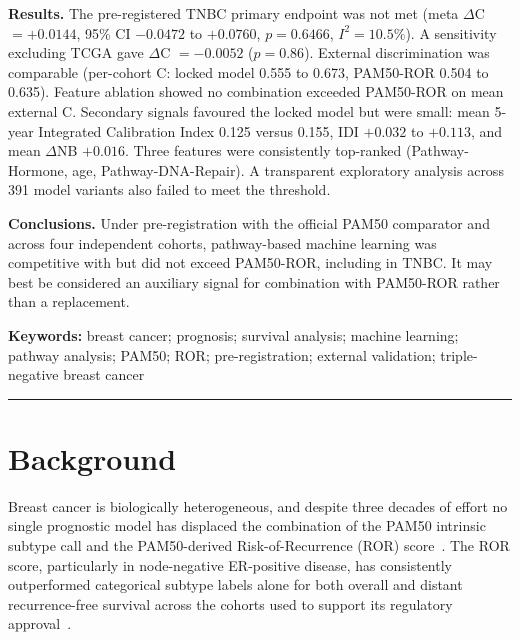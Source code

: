 \documentclass[11pt,letterpaper]{article}
\begin{document}
\noindent\textbf{Results.} The pre-registered TNBC primary endpoint was not met (meta $\Delta$C $= +0.0144$, 95\% CI $-0.0472$ to $+0.0760$, $p = 0.6466$, $I^2 = 10.5\%$). A sensitivity excluding TCGA gave $\Delta$C $= -0.0052$ ($p = 0.86$). External discrimination was comparable (per-cohort C: locked model 0.555 to 0.673, PAM50-ROR 0.504 to 0.635). Feature ablation showed no combination exceeded PAM50-ROR on mean external C. Secondary signals favoured the locked model but were small: mean 5-year Integrated Calibration Index 0.125 versus 0.155, IDI $+0.032$ to $+0.113$, and mean $\Delta$NB $+0.016$. Three features were consistently top-ranked (Pathway-Hormone, age, Pathway-DNA-Repair). A transparent exploratory analysis across 391 model variants also failed to meet the threshold.

\noindent\textbf{Conclusions.} Under pre-registration with the official PAM50 comparator and across four independent cohorts, pathway-based machine learning was competitive with but did not exceed PAM50-ROR, including in TNBC. It may best be considered an auxiliary signal for combination with PAM50-ROR rather than a replacement.

\vspace{0.5em}
\noindent\textbf{Keywords:} breast cancer; prognosis; survival analysis; machine learning; pathway analysis; PAM50; ROR; pre-registration; external validation; triple-negative breast cancer

\vspace{1em}
\hrule
\vspace{1em}


\section*{Background}

Breast cancer is biologically heterogeneous, and despite three decades of effort no single prognostic model has displaced the combination of the PAM50 intrinsic subtype call and the PAM50-derived Risk-of-Recurrence (ROR) score~\cite{parker2009supervised,perou2000molecular}. The ROR score, particularly in node-negative ER-positive disease, has consistently outperformed categorical subtype labels alone for both overall and distant recurrence-free survival across the cohorts used to support its regulatory approval~\cite{parker2009supervised,gendoo2016genefu}.
\end{document}
